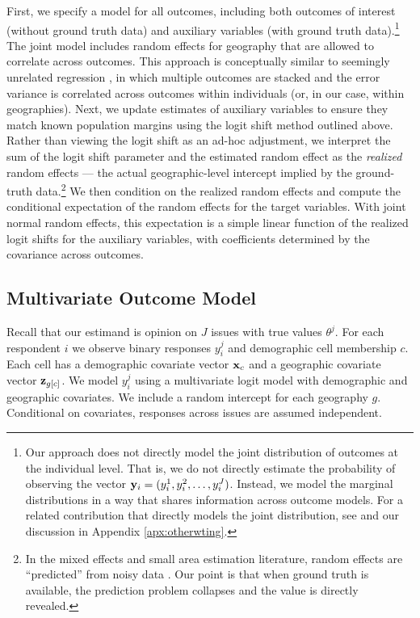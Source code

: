 First, we specify a model for all outcomes, including both outcomes of interest (without ground truth data) and auxiliary variables (with ground truth data).\footnote{Our approach does not directly model the joint distribution of outcomes at the individual level. That is, we do not directly estimate the probability of observing the vector $\mathbf{y}_i = (y_i^1, y_i^2, \dots, y_i^J)$. Instead, we model the marginal distributions in a way that shares information across outcome models. For a related contribution that directly models the joint distribution, see \citet{Goplerud2025} and our discussion in Appendix \ref{apx:otherwting}.}
The joint model includes random effects for geography that are allowed to correlate across outcomes. 
This approach is conceptually similar to seemingly unrelated regression \citep{Zellner1962}, in which multiple outcomes are stacked and the error variance is correlated  across outcomes within individuals (or, in our case, within geographies).
Next, we update estimates of auxiliary variables to ensure they match known population margins using the logit shift method outlined above. 
Rather than viewing the logit shift as an ad-hoc adjustment, we interpret the sum of the logit shift parameter and the estimated random effect as the \textit{realized} random effects --- the actual geographic-level intercept implied by the ground-truth data.\footnote{In the mixed effects and small area estimation literature, random effects are ``predicted'' from noisy data \citep{Robinson1991}. Our point is that when ground truth is available, the prediction problem collapses and the value is directly revealed.} 
We then condition on the realized random effects and compute the conditional expectation of the random effects for the target variables. 
With joint normal random effects, this expectation is a simple linear function of the realized logit shifts for the auxiliary variables, with coefficients determined by the covariance across outcomes.



\subsection{Multivariate Outcome Model}

Recall that our estimand is opinion on $J$ issues with true values $\theta^j$. For each respondent $i$ we observe binary responses $y_i^j$ and demographic cell membership $c$.
Each cell has a demographic covariate vector $\mathbf{x}_{c}$ and a geographic covariate vector $\mathbf{z}_{g[c]}$.
We model $y_i^j$ using a multivariate logit model with demographic and geographic covariates. We include a random intercept for each geography $g$. Conditional on covariates, responses across issues are assumed independent.



